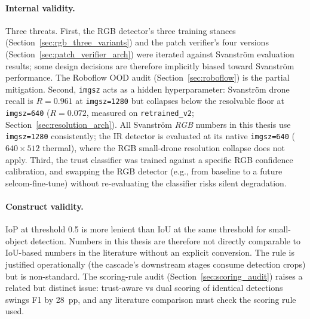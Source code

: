 \paragraph{Internal validity.}
Three threats. First, the RGB detector's three training stances (Section~\ref{sec:rgb_three_variants}) and the patch verifier's four versions (Section~\ref{sec:patch_verifier_arch}) were iterated against Svanstr\"om evaluation results; some design decisions are therefore implicitly biased toward Svanstr\"om performance. The Roboflow OOD audit (Section~\ref{sec:roboflow}) is the partial mitigation. Second, \texttt{imgsz} acts as a hidden hyperparameter: Svanstr\"om drone recall is $R=0.961$ at \texttt{imgsz=1280} but collapses below the resolvable floor at \texttt{imgsz=640} ($R=0.072$, measured on \texttt{retrained\_v2}; Section~\ref{sec:resolution_arch}). All Svanstr\"om \emph{RGB} numbers in this thesis use \texttt{imgsz=1280} consistently; the IR detector is evaluated at its native \texttt{imgsz=640} ($640{\times}512$ thermal), where the RGB small-drone resolution collapse does not apply. Third, the trust classifier was trained against a specific RGB confidence calibration, and swapping the RGB detector (e.g., from baseline to a future selcom-fine-tune) without re-evaluating the classifier risks silent degradation.

\paragraph{Construct validity.}
IoP at threshold 0.5 is more lenient than IoU at the same threshold for small-object detection. Numbers in this thesis are therefore not directly comparable to IoU-based numbers in the literature without an explicit conversion. The rule is justified operationally (the cascade's downstream stages consume detection crops) but is non-standard. The scoring-rule audit (Section~\ref{sec:scoring_audit}) raises a related but distinct issue: trust-aware vs dual scoring of identical detections swings F1 by 28~pp, and any literature comparison must check the scoring rule used.

